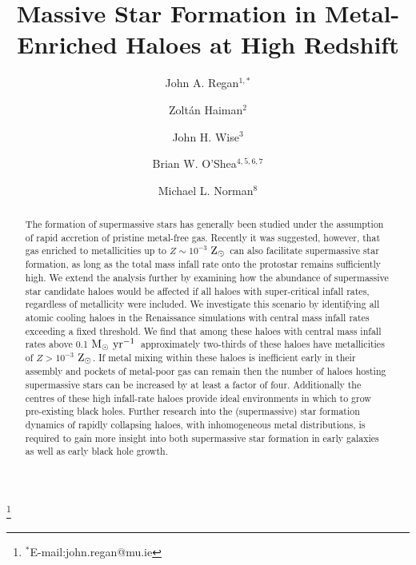 \documentclass[twocolumn,iop,revtex4]{openjournal}
\newcommand{\msolaryrc} {$\rm{M_{\odot}~yr^{-1}}$}
\newcommand{\zsolar} {$\rm{Z_{\odot}}~$}
\newcommand{\zsolarc} {$\rm{Z_{\odot}}$}
\begin{document}
\title{Massive Star Formation in Metal-Enriched Haloes at High Redshift}
\author{John A. Regan$^{1, *}$}
\thanks{$^*$E-mail:john.regan@mu.ie}
\author{Zolt\'an Haiman$^{2}$}
\author{John H. Wise$^{3}$}
\author{Brian W. O'Shea$^{4,5,6,7}$}
\author{Michael L. Norman$^8$}


\begin{abstract}
  The formation of supermassive stars has generally been studied under the assumption of 
  rapid accretion of pristine metal-free gas. Recently it was suggested, however, that gas enriched
  to metallicities up to $Z \sim 10^{-3}$ \zsolar can also facilitate supermassive star formation,
  as long as the total mass infall rate onto the protostar remains sufficiently high. We extend the
  analysis further by examining how the abundance of supermassive star candidate haloes would be
  affected if all haloes with super-critical infall rates, regardless of metallicity
  were included. We investigate this scenario by identifying all atomic cooling haloes in the
  Renaissance simulations with central mass infall rates exceeding a fixed threshold.
  We find that among these haloes with central mass infall rates above 0.1 \msolaryrc\ approximately
  two-thirds of these haloes have metallicities of $Z > 10^{-3}$ \zsolarc.
  If metal mixing within these haloes is
  inefficient early in their assembly and pockets of metal-poor gas can remain then the
  number of haloes hosting supermassive stars can be increased by at least a factor of four.
  Additionally the centres of these high infall-rate haloes provide ideal environments in which to grow
  pre-existing black holes. Further research into the (supermassive) star
  formation dynamics of rapidly collapsing haloes, with inhomogeneous
  metal distributions, is required to gain more insight into both supermassive star
  formation in early galaxies as well as early black hole growth.   
\end{abstract}
\end{document}
